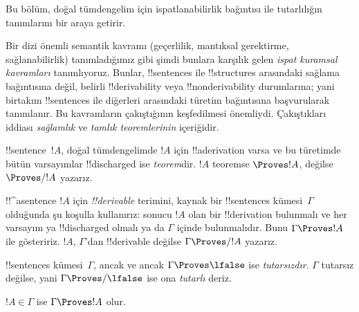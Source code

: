 \documentclass[../../../include/open-logic-section]{subfiles}
\begin{document}
      {}
      {}


\begin{editorial}
Bu bölüm, doğal tümdengelim için ispatlanabilirlik bağıntısı ile tutarlılığın
tanımlarını bir araya getirir.
\end{editorial}

\begin{explain}
Bir dizi önemli semantik kavramı (geçerlilik, mantıksal gerektirme,
sağlanabilirlik) tanımladığımız gibi şimdi bunlara karşılık gelen
\emph{ispat kuramsal kavramları} tanımlıyoruz. Bunlar, !!{sentence}s ile
!!{structure}s arasındaki sağlama bağıntısına değil, belirli
!!{derivability} veya !!{nonderivability} durumlarına; yani birtakım
!!{sentence}s ile diğerleri arasındaki türetim bağıntısına başvurularak
tanımlanır. Bu kavramların çakıştığının keşfedilmesi
önemliydi. Çakıştıkları iddiası \emph{sağlamlık} ve \emph{tamlık
teoremlerinin} içeriğidir.
\end{explain}


\begin{defn}[Teoremler]
!!{sentence}~$!A$, doğal tümdengelimde $!A$ için !!a{derivation} varsa ve bu
türetimde bütün varsayımlar !!{discharged} ise \emph{teorem}dir.
$!A$ teoremse
$\Proves !A$, değilse $\Proves/ !A$ yazarız.
\end{defn}

\begin{defn}[!!^{derivability}]
!!^a{sentence} $!A$ için \emph{!!{derivable}} terimini, kaynak bir
!!{sentence}s kümesi~$\Gamma$ olduğunda şu koşulla kullanırız: sonucu $!A$
olan bir !!{derivation} bulunmalı ve her varsayım ya !!{discharged} olmalı ya
da $\Gamma$ içinde bulunmalıdır. Bunu $\Gamma \Proves !A$ ile gösteririz.
$!A$, $\Gamma$'dan !!{derivable} değilse $\Gamma \Proves/ !A$ yazarız.
\end{defn}

\begin{defn}[Tutarlılık]
!!{sentence}s kümesi~$\Gamma$, ancak ve ancak $\Gamma \Proves \lfalse$ ise
\emph{tutarsızdır}. $\Gamma$ tutarsız değilse, yani $\Gamma \Proves/
\lfalse$ ise ona \emph{tutarlı} deriz.
\end{defn}

\begin{prop}[Yansıma]
$!A \in \Gamma$ ise $\Gamma \Proves !A$ olur.
\end{prop}
\end{document}

